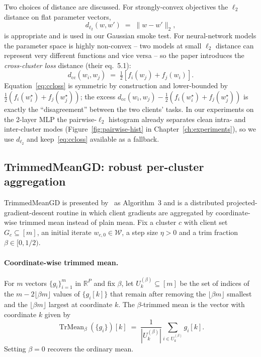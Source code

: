 Two choices of distance are discussed. For strongly-convex objectives the $\ell_2$ distance on flat parameter vectors,
\begin{equation}\label{eq:l2}
    d_{\ell_2}(w, w') \;=\; \lVert w - w' \rVert_2,
\end{equation}
is appropriate and is used in our Gaussian smoke test. For neural-network models the parameter space is highly non-convex -- two models at small $\ell_2$ distance can represent very different functions and vice versa -- so the paper introduces the \emph{cross-cluster loss} distance (their eq.~5.1):
\begin{equation}\label{eq:ccloss}
    d_\mathrm{cc}(w_i, w_j) \;=\; \tfrac{1}{2}\left[ f_i(w_j) + f_j(w_i) \right].
\end{equation}
Equation~\eqref{eq:ccloss} is symmetric by construction and lower-bounded by $\tfrac{1}{2}(f_i(w^\star_i) + f_j(w^\star_j))$; the excess $d_\mathrm{cc}(w_i, w_j) - \tfrac{1}{2}(f_i(w^\star_i) + f_j(w^\star_j))$ is exactly the ``disagreement'' between the two clients' tasks. In our experiments on the 2-layer MLP the pairwise-$\ell_2$ histogram already separates clean intra- and inter-cluster modes (Figure~\ref{fig:pairwise-hist} in Chapter~\ref{ch:experiments}), so we use $d_{\ell_2}$ and keep~\eqref{eq:ccloss} available as a fallback.

\subsection{TrimmedMeanGD: robust per-cluster aggregation}\label{sec:tmgd}

TrimmedMeanGD is presented by~\parencite{vardhan2024srfca} as Algorithm~3 and is a distributed projected-gradient-descent routine in which client gradients are aggregated by coordinate-wise trimmed mean instead of plain mean. Fix a cluster $c$ with client set $G_c \subseteq [m]$, an initial iterate $w_{c,0} \in \mathcal{W}$, a step size $\eta > 0$ and a trim fraction $\beta \in [0, 1/2)$.

\paragraph{Coordinate-wise trimmed mean.} For $m$ vectors $\{g_i\}_{i=1}^m$ in $\mathbb{R}^P$ and fix $\beta$, let $U_k^{(\beta)} \subseteq [m]$ be the set of indices of the $m - 2\lfloor \beta m\rfloor$ values of $\{g_i[k]\}$ that remain after removing the $\lfloor \beta m\rfloor$ smallest and the $\lfloor \beta m\rfloor$ largest at coordinate $k$. The $\beta$-trimmed mean is the vector with coordinate $k$ given by
\begin{equation}\label{eq:trimmedmean}
    \operatorname{TrMean}_\beta(\{g_i\})[k] \;=\; \frac{1}{|U_k^{(\beta)}|} \sum_{i \in U_k^{(\beta)}} g_i[k].
\end{equation}
Setting $\beta = 0$ recovers the ordinary mean.

